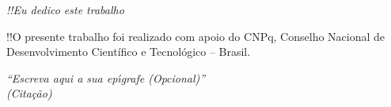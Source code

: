 \documentclass[
    12pt,                %
    oneside,            %
    a4paper,            %
    english,            %
    french,                %
    spanish,            %
    brazil                %
    ]{abntex2}
\begin{document}
\begin{dedicatoria}
   \vspace*{\fill}
   \centering
   \noindent
   \textit{!!Eu dedico este trabalho} \vspace*{\fill}
\end{dedicatoria}

\begin{agradecimentos}
    !!O presente trabalho foi realizado com apoio do CNPq, Conselho Nacional de Desenvolvimento Científico  e Tecnológico – Brasil.
\end{agradecimentos}

\begin{epigrafe}
    \vspace*{\fill}
	\begin{flushright}
		\textit{``Escreva aqui a sua ep\'{\i}grafe (Opcional)''\\
		(Cita\c{c}\~{a}o)}
	\end{flushright}
\end{epigrafe}

\end{document}
